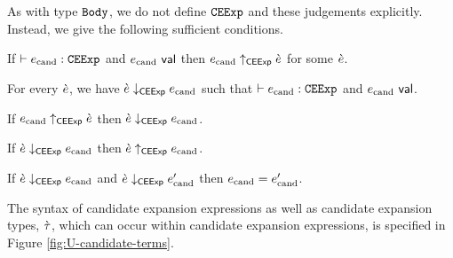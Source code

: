\begin{enumerate}
As with type $\mathtt{Body}$, we do not define $\mathtt{CEExp}$ and these judgements explicitly. Instead, we give  the following sufficient conditions.

\begin{condition} If $\vdash e_\text{cand} : \mathtt{CEExp}$ and $e_\text{cand}~\mathsf{val}$ then $e_\text{cand} \uparrow_\mathsf{CEExp} \grave{e}$ for some $\grave{e}$. \end{condition}
\begin{condition} For every $\grave{e}$, we have $\grave{e} \downarrow_\mathsf{CEExp} e_\text{cand}$ such that $\vdash e_\text{cand} : \mathtt{CEExp}$ and $e_\text{cand}~\mathsf{val}$. \end{condition}
\begin{condition} If $e_\text{cand} \uparrow_\mathsf{CEExp} \grave{e}$ then $\grave{e} \downarrow_\mathsf{CEExp} e_\text{cand}$. \end{condition}
\begin{condition} If $\grave{e} \downarrow_\mathsf{CEExp} e_\text{cand}$ then $\grave{e} \uparrow_\mathsf{CEExp} e_\text{cand}$. \end{condition}
\begin{condition} If $\grave{e} \downarrow_\mathsf{CEExp} e_\text{cand}$ and $\grave{e} \downarrow_\mathsf{CEExp} e_\text{cand}'$ then $e_\text{cand}=e_\text{cand}'$. \end{condition}

The syntax of candidate expansion expressions as well as candidate expansion types, $\grave{\tau}$, which can occur within candidate expansion expressions, is specified in Figure \ref{fig:U-candidate-terms}.



\end{enumerate}
